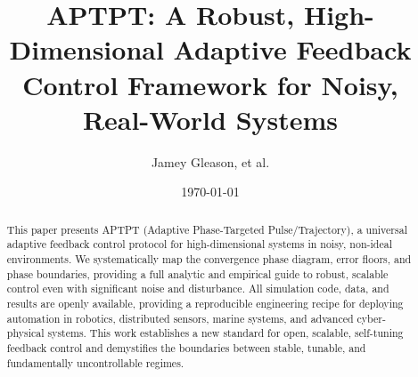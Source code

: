 \documentclass[12pt]{article}
\title{APTPT: A Robust, High-Dimensional Adaptive Feedback Control Framework for Noisy, Real-World Systems}
\author{Jamey Gleason, et al.}
\date{\today}
\begin{document}
\maketitle

\begin{abstract}
This paper presents APTPT (Adaptive Phase-Targeted Pulse/Trajectory), a universal adaptive feedback control protocol for high-dimensional systems in noisy, non-ideal environments. We systematically map the convergence phase diagram, error floors, and phase boundaries, providing a full analytic and empirical guide to robust, scalable control even with significant noise and disturbance. All simulation code, data, and results are openly available, providing a reproducible engineering recipe for deploying automation in robotics, distributed sensors, marine systems, and advanced cyber-physical systems. This work establishes a new standard for open, scalable, self-tuning feedback control and demystifies the boundaries between stable, tunable, and fundamentally uncontrollable regimes.
\end{abstract}

\end{document}
